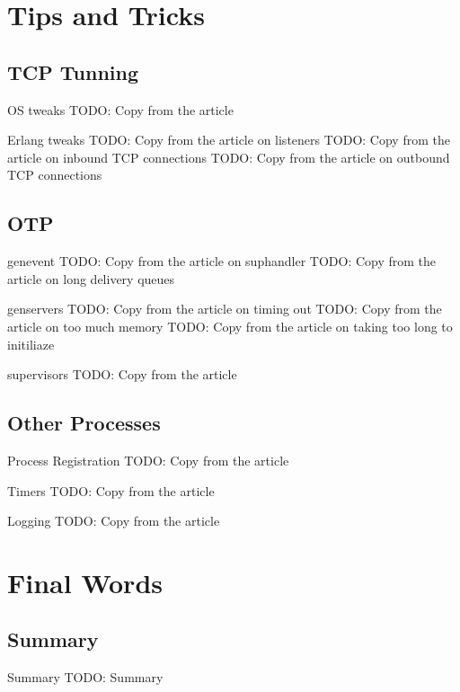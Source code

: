 \documentclass[utf8]{beamer}
\begin{document}
\section{Tips and Tricks}
\subsection{TCP Tunning}
\begin{frame}{OS tweaks}
	TODO: Copy from the article
\end{frame}
\begin{frame}{Erlang tweaks}
	TODO: Copy from the article on listeners
	TODO: Copy from the article on inbound TCP connections
	TODO: Copy from the article on outbound TCP connections
\end{frame}
\subsection{OTP}
\begin{frame}{gen\textunderscore event}
	TODO: Copy from the article on sup\textunderscore handler
	TODO: Copy from the article on long delivery queues
\end{frame}
\begin{frame}{gen\textunderscore servers}
	TODO: Copy from the article on timing out
	TODO: Copy from the article on too much memory
	TODO: Copy from the article on taking too long to initiliaze
\end{frame}
\begin{frame}{supervisors}
	TODO: Copy from the article
\end{frame}
\subsection{Other Processes}
\begin{frame}{Process Registration}
	TODO: Copy from the article
\end{frame}
\begin{frame}{Timers}
	TODO: Copy from the article
\end{frame}
\begin{frame}{Logging}
	TODO: Copy from the article
\end{frame}

\section{Final Words}
\subsection{Summary}
\begin{frame}{Summary}
	TODO: Summary
\end{frame}
\end{document}
